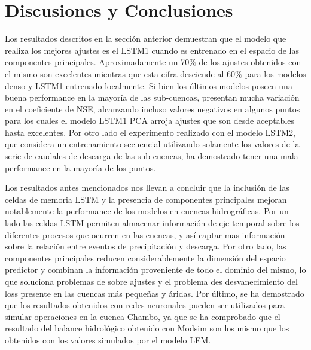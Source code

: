 \chapter{Discusiones y Conclusiones}
\label{Discusiones y conclusiones}

Los resultados descritos en la sección anterior demuestran que el modelo que realiza los mejores ajustes es el LSTM1 cuando es entrenado en 
el espacio de las componentes principales. Aproximadamente un 70$\%$ de los ajustes obtenidos con el mismo son excelentes mientras que esta cifra  
desciende al 60$\%$ para los modelos denso y LSTM1 entrenado localmente. Si bien los últimos modelos poseen una buena performance en la mayoría de 
las sub-cuencas, presentan mucha variación en el coeficiente de NSE, alcanzando incluso valores negativos en algunos puntos para los cuales 
el modelo LSTM1 PCA arroja ajustes que son desde aceptables hasta excelentes. Por otro lado el experimento realizado con el modelo LSTM2, que considera 
un entrenamiento secuencial utilizando solamente los valores de la serie de caudales de descarga de las sub-cuencas, ha demostrado
tener una  mala performance en la mayoría de los puntos. 

Los resultados antes mencionados nos llevan a concluir que la inclusión de las celdas de memoria LSTM y la presencia de componentes principales 
mejoran notablemente la performance de los modelos en cuencas hidrográficas. 
Por un lado las celdas LSTM permiten almacenar información de eje temporal sobre los diferentes procesos  que ocurren en  las cuencas,
y así captar mas información sobre la relación entre eventos de precipitación y descarga. Por otro lado, 
las componentes principales reducen considerablemente la dimensión del espacio predictor
y combinan la información proveniente de todo el dominio del mismo, lo que soluciona problemas de sobre ajustes y el problema
des desvanecimiento del loss presente en las cuencas más pequeñas y áridas. 
Por último, se ha demostrado que los resultados obtenidos con redes neuronales
pueden ser utilizados para simular operaciones en la cuenca Chambo, ya que se ha comprobado que
el resultado del balance hidrológico obtenido con Modsim son los mismo que los obtenidos con los valores simulados por el modelo LEM.


